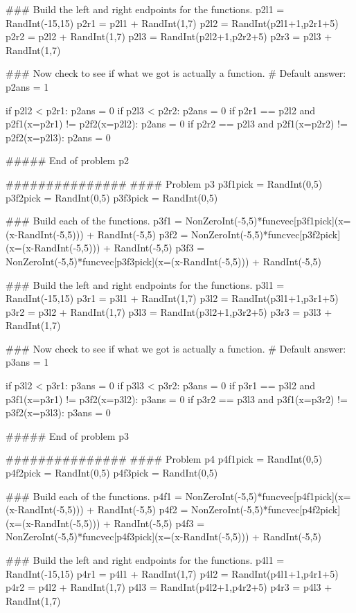 \documentclass{ximera}
\begin{document}
\begin{sagesilent}
### Build the left and right endpoints for the functions.
p2l1 = RandInt(-15,15)
p2r1 = p2l1 + RandInt(1,7)
p2l2 = RandInt(p2l1+1,p2r1+5)
p2r2 = p2l2 + RandInt(1,7)
p2l3 = RandInt(p2l2+1,p2r2+5)
p2r3 = p2l3 + RandInt(1,7)

### Now check to see if what we got is actually a function.
# Default answer:
p2ans = 1

if p2l2 < p2r1:
    p2ans = 0
if p2l3 < p2r2:
    p2ans = 0
if p2r1 == p2l2 and p2f1(x=p2r1) != p2f2(x=p2l2):
    p2ans = 0
if p2r2 == p2l3 and p2f1(x=p2r2) != p2f2(x=p2l3):
    p2ans = 0

##### End of problem p2




###############
#### Problem p3
p3f1pick = RandInt(0,5)
p3f2pick = RandInt(0,5)
p3f3pick = RandInt(0,5)

### Build each of the functions.
p3f1 = NonZeroInt(-5,5)*funcvec[p3f1pick](x=(x-RandInt(-5,5))) + RandInt(-5,5)
p3f2 = NonZeroInt(-5,5)*funcvec[p3f2pick](x=(x-RandInt(-5,5))) + RandInt(-5,5)
p3f3 = NonZeroInt(-5,5)*funcvec[p3f3pick](x=(x-RandInt(-5,5))) + RandInt(-5,5)

### Build the left and right endpoints for the functions.
p3l1 = RandInt(-15,15)
p3r1 = p3l1 + RandInt(1,7)
p3l2 = RandInt(p3l1+1,p3r1+5)
p3r2 = p3l2 + RandInt(1,7)
p3l3 = RandInt(p3l2+1,p3r2+5)
p3r3 = p3l3 + RandInt(1,7)

### Now check to see if what we got is actually a function.
# Default answer:
p3ans = 1

if p3l2 < p3r1:
    p3ans = 0
if p3l3 < p3r2:
    p3ans = 0
if p3r1 == p3l2 and p3f1(x=p3r1) != p3f2(x=p3l2):
    p3ans = 0
if p3r2 == p3l3 and p3f1(x=p3r2) != p3f2(x=p3l3):
    p3ans = 0

##### End of problem p3




###############
#### Problem p4
p4f1pick = RandInt(0,5)
p4f2pick = RandInt(0,5)
p4f3pick = RandInt(0,5)

### Build each of the functions.
p4f1 = NonZeroInt(-5,5)*funcvec[p4f1pick](x=(x-RandInt(-5,5))) + RandInt(-5,5)
p4f2 = NonZeroInt(-5,5)*funcvec[p4f2pick](x=(x-RandInt(-5,5))) + RandInt(-5,5)
p4f3 = NonZeroInt(-5,5)*funcvec[p4f3pick](x=(x-RandInt(-5,5))) + RandInt(-5,5)

### Build the left and right endpoints for the functions.
p4l1 = RandInt(-15,15)
p4r1 = p4l1 + RandInt(1,7)
p4l2 = RandInt(p4l1+1,p4r1+5)
p4r2 = p4l2 + RandInt(1,7)
p4l3 = RandInt(p4l2+1,p4r2+5)
p4r3 = p4l3 + RandInt(1,7)


\end{sagesilent}
\end{document}
